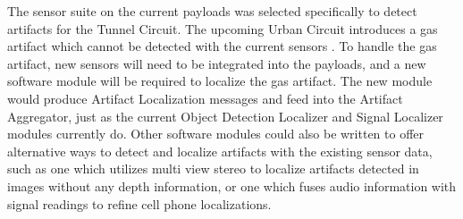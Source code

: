The sensor suite on the current payloads was selected specifically to detect artifacts for the Tunnel Circuit. The upcoming Urban Circuit introduces a gas artifact which cannot be detected with the current sensors \cite{urban_artifacts}. To handle the gas artifact, new sensors will need to be integrated into the payloads, and a new software module will be required to localize the gas artifact. The new module would produce Artifact Localization messages and feed into the Artifact Aggregator, just as the current Object Detection Localizer and Signal Localizer modules currently do. Other software modules could also be written to offer alternative ways to detect and localize artifacts with the existing sensor data, such as one which utilizes multi view stereo to localize artifacts detected in images without any depth information, or one which fuses audio information with signal readings to refine cell phone localizations.